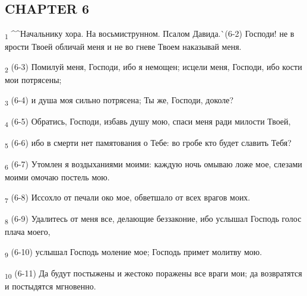 \subsection{CHAPTER 6}
\begin{tcolorbox}
\textsubscript{1} ^^Начальнику хора. На восьмиструнном. Псалом Давида.^^ (6-2) Господи! не в ярости Твоей обличай меня и не во гневе Твоем наказывай меня.
\end{tcolorbox}
\begin{tcolorbox}
\textsubscript{2} (6-3) Помилуй меня, Господи, ибо я немощен; исцели меня, Господи, ибо кости мои потрясены;
\end{tcolorbox}
\begin{tcolorbox}
\textsubscript{3} (6-4) и душа моя сильно потрясена; Ты же, Господи, доколе?
\end{tcolorbox}
\begin{tcolorbox}
\textsubscript{4} (6-5) Обратись, Господи, избавь душу мою, спаси меня ради милости Твоей,
\end{tcolorbox}
\begin{tcolorbox}
\textsubscript{5} (6-6) ибо в смерти нет памятования о Тебе: во гробе кто будет славить Тебя?
\end{tcolorbox}
\begin{tcolorbox}
\textsubscript{6} (6-7) Утомлен я воздыханиями моими: каждую ночь омываю ложе мое, слезами моими омочаю постель мою.
\end{tcolorbox}
\begin{tcolorbox}
\textsubscript{7} (6-8) Иссохло от печали око мое, обветшало от всех врагов моих.
\end{tcolorbox}
\begin{tcolorbox}
\textsubscript{8} (6-9) Удалитесь от меня все, делающие беззаконие, ибо услышал Господь голос плача моего,
\end{tcolorbox}
\begin{tcolorbox}
\textsubscript{9} (6-10) услышал Господь моление мое; Господь примет молитву мою.
\end{tcolorbox}
\begin{tcolorbox}
\textsubscript{10} (6-11) Да будут постыжены и жестоко поражены все враги мои; да возвратятся и постыдятся мгновенно.
\end{tcolorbox}
